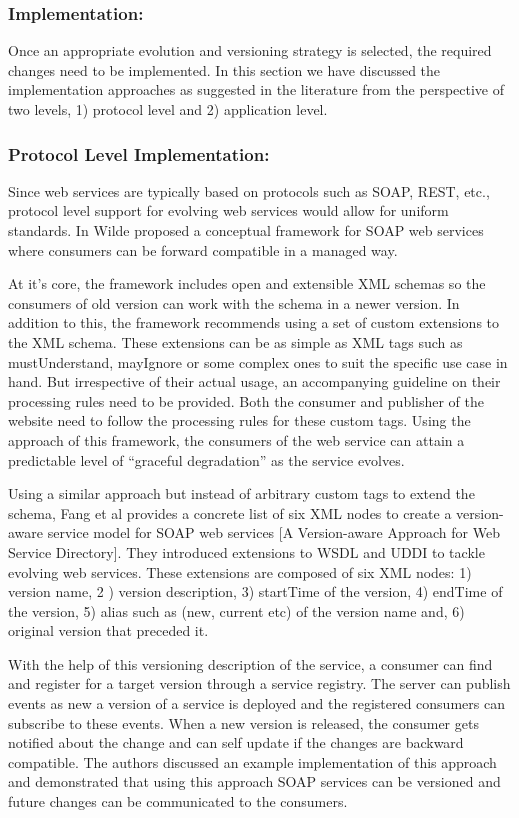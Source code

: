 \documentclass[runningheads,a4paper]{llncs}
\begin{document}
\subsubsection{Implementation:}
Once an appropriate evolution and versioning strategy is selected, the required changes need to be implemented. In this section we have discussed the implementation approaches as suggested in the literature from the perspective of two levels, 1) protocol level and 2) application level.

\subsubsection{Protocol Level Implementation:}
Since web services are typically based on protocols such as SOAP, REST, etc., protocol level support for evolving web services would allow for uniform standards. In \cite{wilde2004semantically} Wilde proposed a conceptual framework for SOAP web services where consumers can be forward compatible in a managed way.

At it’s core, the framework includes open and extensible XML schemas so the consumers of old version can work with the schema in a newer version. In addition to this, the framework recommends using a set of custom extensions to the XML schema. These extensions can be as simple as XML tags such as mustUnderstand, mayIgnore or some complex ones to suit the specific use case in hand. But irrespective of their actual usage, an accompanying guideline on their processing rules need to be provided. Both the consumer and publisher of the website need to follow the processing rules for these custom tags. Using the approach of this framework, the consumers of the web service can attain a predictable level of ``graceful degradation'' as the service evolves.

Using a similar approach but instead of arbitrary custom tags to extend the schema, Fang et al provides a concrete list of six XML nodes to create a version-aware service model for SOAP web services [A Version-aware Approach for Web Service Directory]. They introduced extensions to WSDL and UDDI to tackle evolving web services. These extensions are composed of six XML nodes: 1) version name, 2 ) version description, 3) startTime of the version, 4) endTime of the version, 5) alias such as (new, current etc) of the version name and, 6) original version that preceded it.

With the help of this versioning description of the service, a consumer can find and register for a target version through a service registry. The server can publish events as new a version of a service is deployed and the registered consumers can subscribe to these events. When a new version is released, the consumer gets notified about the change and can self update if the changes are backward compatible. The authors discussed an example implementation of this approach and demonstrated that using this approach SOAP services can be versioned and future changes can be communicated to the consumers.
\end{document}
